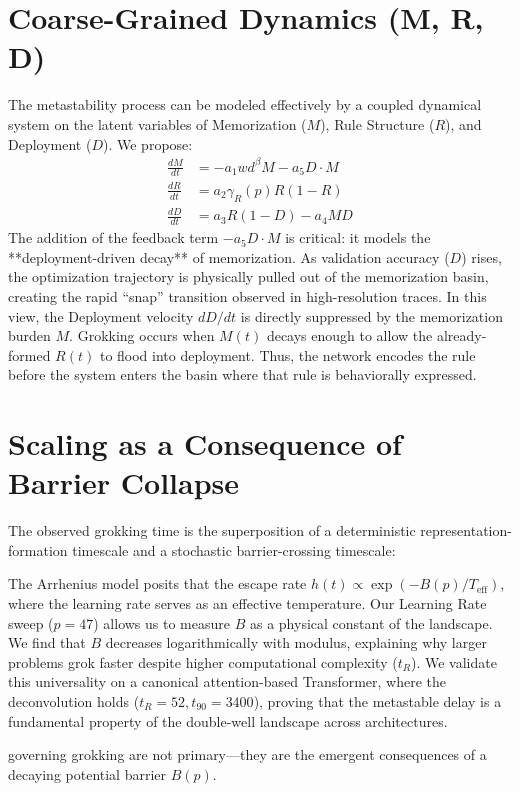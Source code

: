 \documentclass[11pt]{article}
\begin{document}
\section{Coarse-Grained Dynamics (M, R, D)}
The metastability process can be modeled effectively by a coupled dynamical system on the latent variables of Memorization ($M$), Rule Structure ($R$), and Deployment ($D$). We propose:
\begin{align}
\frac{dM}{dt} &= -a_1 wd^\beta M - a_5 D \cdot M \\
\frac{dR}{dt} &= a_2 \gamma_R(p) R(1-R) \\
\frac{dD}{dt} &= a_3 R(1-D) - a_4 M D
\end{align}
The addition of the feedback term $-a_5 D \cdot M$ is critical: it models the **deployment-driven decay** of memorization. As validation accuracy ($D$) rises, the optimization trajectory is physically pulled out of the memorization basin, creating the rapid ``snap'' transition observed in high-resolution traces.
In this view, the Deployment velocity $dD/dt$ is directly suppressed by the memorization burden $M$. Grokking occurs when $M(t)$ decays enough to allow the already-formed $R(t)$ to flood into deployment. Thus, the network encodes the rule before the system enters the basin where that rule is behaviorally expressed.

\section{Scaling as a Consequence of Barrier Collapse}
The observed grokking time is the superposition of a deterministic representation-formation timescale and a stochastic barrier-crossing timescale:

The Arrhenius model posits that the escape rate $h(t) \propto \exp(-B(p) / T_{\text{eff}})$, where the learning rate serves as an effective temperature. Our Learning Rate sweep ($p=47$) allows us to measure $B$ as a physical constant of the landscape. We find that $B$ decreases logarithmically with modulus, explaining why larger problems grok faster despite higher computational complexity ($t_R$). We validate this universality on a canonical attention-based Transformer, where the deconvolution holds ($t_R=52, t_{90}=3400$), proving that the metastable delay is a fundamental property of the double-well landscape across architectures.

 governing grokking are not primary—they are the emergent consequences of a decaying potential barrier $B(p)$. 
\end{document}
